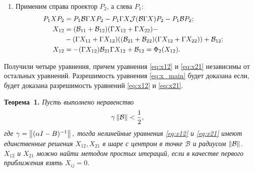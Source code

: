 \begin{enumerate}
	\item Применим справа проектор $P_2$, а слева $P_1$:
	\begin{align}
		P_1 X P_2 &= P_1 \mathcal{B}\Gamma X P_2 - P_1\Gamma X \mathcal{J}(\mathcal{B}\Gamma X)P_2 - P_1 \mathcal{B} P_2; \notag \\
		X_{12} &= (\mathcal{B}_{11} + \mathcal{B}_{12})(\Gamma X_{12} + \Gamma X_{22}) - \notag \\ 
		&- (\Gamma X_{11} + \Gamma X_{12})((\mathcal{B}_{21} + \mathcal{B}_{22})(\Gamma X_{12} + \Gamma X_{22})) + \mathcal{B}_{12}; \notag \\
		X_{12} &= - (\Gamma X_{12})\mathcal{B}_{21}\Gamma X_{12} + \mathcal{B}_{12} = \Phi_2(X_{12}).\label{eq:x12}
	\end{align}
	
\end{enumerate}
Получили четыре уравнения, причем уравнения \eqref{eq:x12} и \eqref{eq:x21} независимы от остальных уравнений. Разрешимость уравнения \eqref{eq:x_main} будет доказана если, будет доказана разрешимость уравнений \eqref{eq:x12} и \eqref{eq:x21}.  

\noindent\textbf{Теорема~1.}
{ \it Пусть выполнено неравенство
$$
\gamma\left\|\mathcal{B}\right\| < \frac{1}{2},
$$
где $\gamma = \left\|(\alpha I - B)^{-1}\right\|,$ тогда нелинейные уравнения \eqref{eq:x12} и \eqref{eq:x21} имеют единственные решения $X_{12}, X_{21}$ в шаре с центром в точке $\mathcal{B}$ и радиусом $\left\|\mathcal{B}\right\|$. $X_{12}$ и $X_{21}$ можно найти методом простых итераций, если в качестве первого приближения взять $X_{ij} = 0.$}

